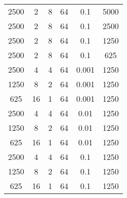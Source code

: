 \begin{tabularx}{\linewidth}{ |c|c|c|c|c|c|  }
    2500 & 2   & 8     & 64  & 0.1   & 5000                                                                                                                               \\
    2500 & 2   & 8     & 64  & 0.1   & 2500                                                                                                                               \\
    2500 & 2   & 8     & 64  & 0.1   & 1250                                                                                                                               \\
    2500 & 2   & 8     & 64  & 0.1   & 625                                                                                                                                \\
    2500 & 4   & 4     & 64  & 0.001 & 1250                                                                                                                               \\
    1250 & 8   & 2     & 64  & 0.001 & 1250                                                                                                                               \\
    625  & 16  & 1     & 64  & 0.001 & 1250                                                                                                                               \\
    2500 & 4   & 4     & 64  & 0.01  & 1250                                                                                                                               \\
    1250 & 8   & 2     & 64  & 0.01  & 1250                                                                                                                               \\
    625  & 16  & 1     & 64  & 0.01  & 1250                                                                                                                               \\
    2500 & 4   & 4     & 64  & 0.1   & 1250                                                                                                                               \\
    1250 & 8   & 2     & 64  & 0.1   & 1250                                                                                                                               \\
    625  & 16  & 1     & 64  & 0.1   & 1250                                                                                                                               \\

\end{tabularx}
